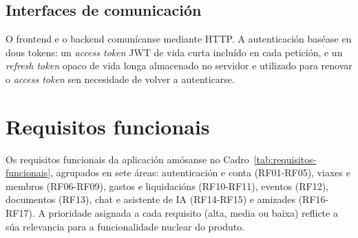 \subsection{Interfaces de comunicación}

O frontend e o backend comunícanse mediante HTTP. A autenticación baséase en dous
tokens: un \textit{access token} JWT de vida curta incluído en cada petición, e un
\textit{refresh token} opaco de vida longa almacenado no servidor e utilizado para
renovar o \textit{access token} sen necesidade de volver a autenticarse.

\section{Requisitos funcionais}

Os requisitos funcionais da aplicación amósanse no Cadro~\ref{tab:requisitos-funcionais},
agrupados en sete áreas: autenticación e conta (RF01-RF05), viaxes e membros (RF06-RF09),
gastos e liquidacións (RF10-RF11), eventos (RF12), documentos (RF13), chat e asistente
de IA (RF14-RF15) e amizades (RF16-RF17). A prioridade asignada a cada requisito
(alta, media ou baixa) reflicte a súa relevancia para a funcionalidade nuclear do produto.

